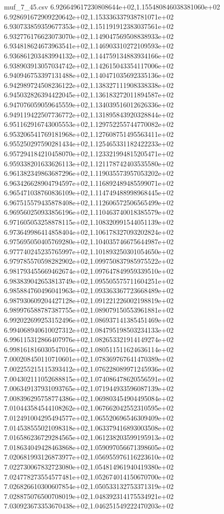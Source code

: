 \begin{filecontents*}{muf_7_45.csv}
6.926649617230808644e+02,1.155480846038381060e+02
6.928691672909220642e+02,1.153336337938781071e+02
6.930733859359677353e+02,1.151191912383037561e+02
6.932776176623073070e+02,1.149047569508838933e+02
6.934818624673963541e+02,1.146903310272109593e+02
6.936861203483994132e+02,1.144759134883934166e+02
6.938903913057034742e+02,1.142615043354117006e+02
6.940946753397131488e+02,1.140471035692335136e+02
6.942989724508236122e+02,1.138327111908338338e+02
6.945032826394422045e+02,1.136183272011894587e+02
6.947076059059645559e+02,1.134039516012626336e+02
6.949119422507736772e+02,1.131895843920328844e+02
6.951162916743005553e+02,1.129752255744770082e+02
6.953206541769181968e+02,1.127608751495563411e+02
6.955250297590281434e+02,1.125465331182422233e+02
6.957294184210458070e+02,1.123321994815205471e+02
6.959338201633626113e+02,1.121178742403535580e+02
6.961382349863687296e+02,1.119035573957053202e+02
6.963426628904794597e+02,1.116892489485599071e+02
6.965471038760836109e+02,1.114749488998968445e+02
6.967515579435878408e+02,1.112606572506565499e+02
6.969560250933856196e+02,1.110463740018385579e+02
6.971605053258878115e+02,1.108320991544051139e+02
6.973649986414858404e+02,1.106178327093202824e+02
6.975695050405769280e+02,1.104035746675644987e+02
6.977740245235765997e+02,1.101893250301054650e+02
6.979785570598282902e+02,1.099750837985975522e+02
6.981793455669462674e+02,1.097647849959339510e+02
6.983839042653813749e+02,1.095505575711604251e+02
6.985884760496041963e+02,1.093363367723668489e+02
6.987930609204427128e+02,1.091221226002198819e+02
6.989976588787387755e+02,1.089079150553961881e+02
6.992022699253152496e+02,1.086937141385451469e+02
6.994068940610027312e+02,1.084795198503234133e+02
6.996115312866407976e+02,1.082653321914149274e+02
6.998161816030547016e+02,1.080511511624636114e+02
7.000208450110710601e+02,1.078369767641470389e+02
7.002255215115393412e+02,1.076228089971245936e+02
7.004302111052688815e+02,1.074086478620556591e+02
7.006349137931093765e+02,1.071944933596087139e+02
7.008396295758774386e+02,1.069803454904495084e+02
7.010443584544108262e+02,1.067662042552310595e+02
7.012491004295494577e+02,1.065520696546309409e+02
7.014538555021098318e+02,1.063379416893003508e+02
7.016586236729284565e+02,1.061238203599195913e+02
7.018634049428463868e+02,1.059097056671398605e+02
7.020681993126873977e+02,1.056955976116223610e+02
7.022730067832723080e+02,1.054814961940419380e+02
7.024778273554577481e+02,1.052674014150670700e+02
7.026826610300607854e+02,1.050533132753371319e+02
7.028875076500708019e+02,1.048392314175534921e+02
7.030923673353670438e+02,1.046251549222470203e+02

\end{filecontents*}
